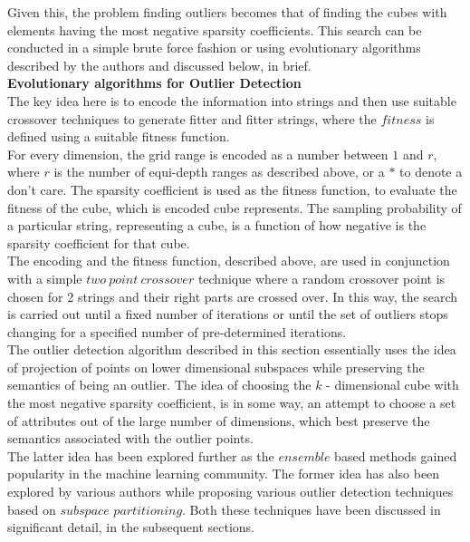 Given this, the problem finding outliers becomes that of finding the cubes with elements having the most negative sparsity coefficients. This search can be conducted in a simple brute force fashion or using evolutionary algorithms described by the authors and discussed below, in brief. \\

\noindent \textbf{Evolutionary algorithms for Outlier Detection} \\

The key idea here is to encode the information into strings and then use suitable crossover techniques to generate fitter and fitter strings, where the $fitness$ is defined using a suitable fitness function. \\

For every dimension, the grid range is encoded as a number between $1$ and $r$, where $r$ is the number of equi-depth ranges as described above, or a $*$ to denote a don't care. The sparsity coefficient is used as the fitness function, to evaluate the fitness of the cube, which is encoded cube represents. The sampling probability of a particular string, representing a cube, is a function of how negative is the sparsity coefficient for that cube. \\

The encoding and the fitness function, described above, are used in conjunction with a simple $two\ point\ crossover$ technique where a random crossover point is chosen for 2 strings and their right parts are crossed over. In this way, the search is carried out until a fixed number of iterations or until the set of outliers stops changing for a specified number of pre-determined iterations. \\

The outlier detection algorithm described in this section essentially uses the idea of projection of points on lower dimensional subspaces while preserving the semantics of being an outlier. The idea of choosing the $k$ - dimensional cube with the most negative sparsity coefficient, is in some way, an attempt to choose a set of attributes out of the large number of dimensions, which best preserve the semantics associated with the outlier points. \\

The latter idea has been explored further as the $ensemble$ based methods gained popularity in the machine learning community. The former idea has also been explored by various authors while proposing various outlier detection techniques based on $subspace$ $partitioning$. Both these techniques have been discussed in significant detail, in the subsequent sections.

